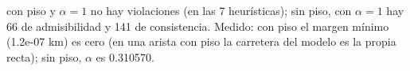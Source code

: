 {con piso y $\alpha = 1$ no hay violaciones (en las 7 heurísticas); sin piso, con $\alpha = 1$ hay 66 de admisibilidad y 141 de consistencia.}
{Medido: con piso el margen mínimo (1.2e-07 km) es cero (en una arista con piso la carretera del modelo es la propia recta); sin piso, $\alpha$ es 0.310570.}
